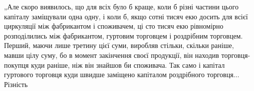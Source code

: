 „Але скоро виявилось, що для всіх було б краще, коли б різні частини
цього капіталу заміщували одна одну, і коли б, якщо сотні тисяч екю
досить для всієї циркуляції між фабрикантом і споживачем, ці сто тисяч
екю рівномірно розподілились між фабрикантом, гуртовим торговцем і
роздрібним торговцем. Перший, маючи лише третину цієї суми, виробляв
стільки, скільки раніше, мавши цілу суму, бо в момент закінчення
своєї продукції, він находив торговця-покупця куди раніше, ніж
він знайшов би споживача. Так само і капітал гуртового торговця
куди швидше заміщено капіталом роздрібного торговця... Різність
\parbreak{}  %
